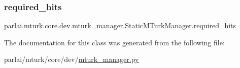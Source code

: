 \subsubsection{\texorpdfstring{required\+\_\+hits}{required\_hits}}
{\footnotesize\ttfamily parlai.\+mturk.\+core.\+dev.\+mturk\+\_\+manager.\+Static\+M\+Turk\+Manager.\+required\+\_\+hits}



The documentation for this class was generated from the following file\+:\begin{DoxyCompactItemize}
\item 
parlai/mturk/core/dev/\hyperlink{dev_2mturk__manager_8py}{mturk\+\_\+manager.\+py}\end{DoxyCompactItemize}
